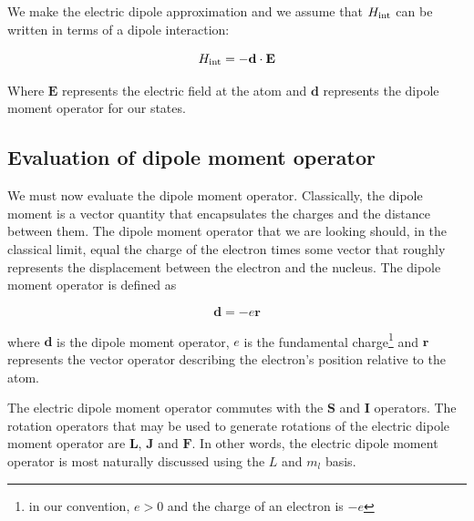 We make the electric dipole approximation and we assume that $H_\textnormal{int}$ can be written in terms of a dipole interaction:  \cite{demilleBudkerKimball}\cite{cuaMITnotes}\cite{gustavsonThesis}\cite{Young1997363}

\begin{equation}
H_\textnormal{int}=-\mathbf{d}\cdot\mathbf{E}
\end{equation}

Where $\mathbf{E}$ represents the electric field at the atom %
and $\mathbf{d}$ represents the dipole moment operator for our states. 


\subsection{Evaluation of dipole moment operator}
We must now evaluate the dipole moment operator. 
Classically, the dipole moment is a vector quantity that encapsulates the charges and the distance between them. The dipole moment operator that we are looking should, in the classical limit, equal the charge of the electron times some vector that roughly represents the displacement between the electron and the nucleus. The dipole moment operator is defined as 

\begin{equation}
\mathbf{d}=-e\mathbf{r}
\end{equation}

where $\mathbf{d}$ is the dipole moment operator, $e$ is the fundamental charge\footnote{in our convention, $e>0$ and the charge of an electron is $-e$} and $\mathbf{r}$ represents the vector operator describing the electron's position relative to the atom\cite{demilleBudkerKimball}.

The electric dipole moment operator commutes with the $\mathbf{S}$ and $\mathbf{I}$ operators. The rotation operators that may be used to generate rotations of the electric dipole moment operator are $\mathbf{L}$, $\mathbf{J}$ and $\mathbf{F}$\cite{DeMille_presentation}. In other words, the electric dipole moment operator is most naturally discussed using the $L$ and $m_l$ basis. 

